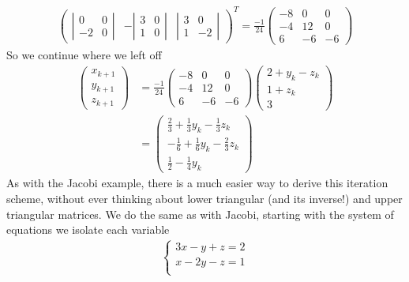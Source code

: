 {\begin{align*}
\begin{pmatrix}
\left| \begin{matrix} 0 & 0 \\ -2 & 0 \end{matrix}\right| &  -\left| \begin{matrix} 3 & 0 \\ 1 & 0 \end{matrix}\right| &  \left| \begin{matrix} 3 & 0 \\ 1 & -2 \end{matrix}\right|
\end{pmatrix}^{T}
=
\frac{-1}{24}
\begin{pmatrix}
-8 &   0 &   0 \\
 -4 &  12 &   0 \\
  6 &  -6 &  -6
\end{pmatrix}
\end{align*}
So we continue where we left off
\begin{align*}
\begin{pmatrix}
x_{k+1} \\
y_{k+1} \\
z_{k+1}
\end{pmatrix} 
&= 
\frac{-1}{24}
\begin{pmatrix}
-8 &   0 &   0 \\
 -4 &  12 &   0 \\
  6 &  -6 &  -6
\end{pmatrix}
\begin{pmatrix}
2  + y_k - z_k \\
1 + z_{k}\\
3
\end{pmatrix}
\\
&= 
\begin{pmatrix}
\frac{2}{3}  + \frac{1}{3}y_k - \frac{1}{3}z_k \\
- \frac{1}{6} + \frac{1}{6}y_k- \frac{2}{3}z_k \\
\frac{1}{2} - \frac{1}{4} y_k
\end{pmatrix}
\end{align*}
As with the Jacobi example, there is a much easier way to derive this iteration scheme, without ever thinking about lower triangular (and its inverse!) and upper triangular matrices. We do the same as with Jacobi, starting with the system of equations we isolate each variable
\begin{align*}
\begin{cases}
3x - y + z = 2 \\
x - 2y - z = 1 \\

\end{cases}
\end{align*}}
